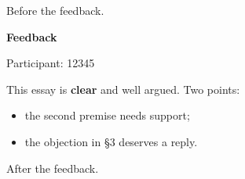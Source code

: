 Before the feedback.

\par\medskip\noindent\textbf{Feedback}\par\nopagebreak
Participant: 12345

This essay is \textbf{clear} and well argued. Two points:

\begin{itemize}
\item the second premise needs support;
\item the objection in §3 deserves a reply.
\end{itemize}
\par\medskip

After the feedback.

